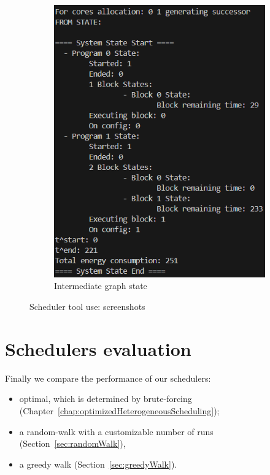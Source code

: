 \begin{figure}
\begin{subfigure}{0.33\textwidth}
        \includegraphics[width=\linewidth]{figs/blockLogScreen.png}
        \caption{Intermediate graph state}
        \label{fig:blockLogScreen}
    \end{subfigure}
     \caption{Scheduler tool use: screenshots}
     \label{fig:screenshots}
\end{figure}

\section{Schedulers evaluation}
\label{sec:evaluation_scheduling}

Finally we compare the performance of our schedulers:
%
\begin{itemize}
\item optimal, which is determined by brute-forcing (Chapter~\ref{chap:optimizedHeterogeneousScheduling});
\item a random-walk with a customizable number of runs (Section~\ref{sec:randomWalk}),
\item a greedy walk (Section~\ref{sec:greedyWalk}).
\end{itemize}
%

